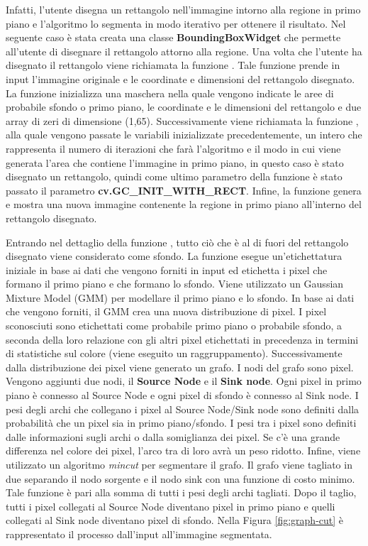 \documentclass{article}
\newcommand{\code}[1]{\texttt{\detokenize{#1}}}
\begin{document}
Infatti, l'utente disegna un rettangolo nell'immagine intorno alla regione in primo piano e l'algoritmo lo segmenta in modo iterativo per ottenere il risultato. 
Nel seguente caso è stata creata una classe \textbf{BoundingBoxWidget} che permette all'utente di disegnare il rettangolo attorno alla regione. Una volta che l'utente ha disegnato il rettangolo viene richiamata la funzione \code{grabcut_algorithm}. Tale funzione prende in input l'immagine originale e le coordinate e dimensioni del rettangolo disegnato. La funzione inizializza una maschera nella quale vengono indicate le aree di probabile sfondo o primo piano, le coordinate e le dimensioni del rettangolo e due array \code{np.float64} di zeri di dimensione (1,65). Successivamente viene richiamata la funzione \code{grabCut()}, alla quale vengono passate le variabili inizializzate precedentemente, un intero che rappresenta il numero di iterazioni che farà l'algoritmo e il modo in cui viene generata l'area che contiene l'immagine in primo piano, in questo caso è stato disegnato un rettangolo, quindi come ultimo parametro della funzione è stato passato il parametro \textbf{cv.GC\_INIT\_WITH\_RECT}.
Infine, la funzione \code{grabcut_algorithm} genera e mostra una nuova immagine contenente la regione in primo piano all'interno del rettangolo disegnato.


\medbreak
Entrando nel dettaglio della funzione \code{grabCut()}, tutto ciò che è al di fuori del rettangolo disegnato viene considerato come sfondo. La funzione esegue un'etichettatura iniziale in base ai dati che vengono forniti in input ed etichetta i pixel che formano il primo piano e che formano lo sfondo.
Viene utilizzato un Gaussian Mixture Model (GMM) per modellare il primo piano e lo sfondo. In base ai dati che vengono forniti, il GMM crea una nuova distribuzione di pixel. I pixel sconosciuti sono etichettati come probabile primo piano o probabile sfondo, a seconda della loro relazione con gli altri pixel etichettati in precedenza in termini di statistiche sul colore (viene eseguito un raggruppamento).
Successivamente dalla distribuzione dei pixel viene generato un grafo. I nodi del grafo sono pixel. Vengono aggiunti due nodi, il \textbf{Source Node} e il \textbf{Sink node}. Ogni pixel in primo piano è connesso al Source Node e ogni pixel di sfondo è connesso al Sink node.
I pesi degli archi che collegano i pixel al Source Node/Sink node sono definiti dalla probabilità che un pixel sia in primo piano/sfondo. I pesi tra i pixel sono definiti dalle informazioni sugli archi o dalla somiglianza dei pixel. Se c'è una grande differenza nel colore dei pixel, l'arco tra di loro avrà un peso ridotto.
Infine, viene utilizzato un algoritmo \textit{mincut} per segmentare il grafo. Il grafo viene tagliato in due separando il nodo sorgente e il nodo sink con una funzione di costo minimo. Tale funzione è pari alla somma di tutti i pesi degli archi tagliati. Dopo il taglio, tutti i pixel collegati al Source Node diventano pixel in primo piano e quelli collegati al Sink node diventano pixel di sfondo.
Nella Figura \ref{fig:graph-cut} è rappresentato il processo dall'input all'immagine segmentata.
\end{document}
